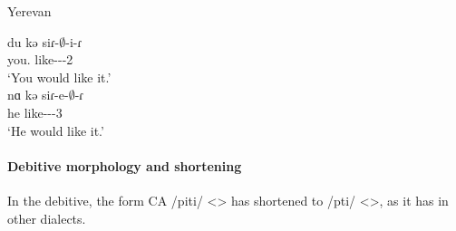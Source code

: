 \begin{table}[H]
	\centering
	\caption{Deletion of the vowel /e/ before the past suffix /i/ in the Yerevan dialect}
	\label{tab:Yerevan:morpho:verb:other:pastEdeletion}
\end{table}

\begin{exe}
	\ex Yerevan\label{sent:yerevan:morpho:verb:other:edeletion} \begin{xlist}
		\ex \gll du kə siɾ-$\emptyset$-i-ɾ \\
		you.{\sg} {\fut} like-{\thgloss}-{\pst}-2{\sg} \\
		\trans `You would like it.' \\
		\ex \gll nɑ kə siɾ-e-$\emptyset$-ɾ \\
		he {\fut} like-{\thgloss}-{\pst}-3{\sg}\\
		\trans `He would like it.' \\
	\end{xlist}
\end{exe}



\paragraph{Debitive morphology and shortening}

In the debitive, the form CA /piti/ <> has shortened to /pti/ <>, as it has in other dialects. 

